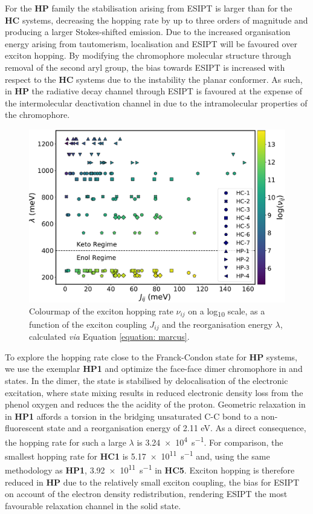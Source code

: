 For the \textbf{HP} family the stabilisation arising from ESIPT is larger than for the \textbf{HC} systems, decreasing the hopping rate by up to three orders of magnitude and producing a larger Stokes-shifted emission. Due to the increased organisation energy arising from tautomerism, localisation and ESIPT will be favoured over exciton hopping. By modifying the chromophore molecular structure through removal of the second aryl group, the bias towards ESIPT is increased with respect to the \textbf{HC} systems due to the instability the planar \Estar{} conformer. As such, in \textbf{HP} the radiative decay channel through ESIPT is favoured at the expense of the intermolecular deactivation channel in \Estar{} due to the intramolecular properties of the chromophore.
\begin{figure}
\centering
  \includegraphics[width=0.8\linewidth]{5ConnectingCrystalStructure/marcus_3dscatter_vdw.pdf}
  \caption[Exciton hopping rates]{Colourmap of the exciton hopping rate $\nu_{ij}$ on a log\textsubscript{10} scale, as a function of the exciton coupling $J_{ij}$ and the reorganisation energy $\lambda$, calculated \textit{via} Equation \ref{equation: marcus}.}
  \label{figure: marcus_scatter_vdw}
\end{figure}

To explore the hopping rate close to the Franck-Condon state for \textbf{HP} systems, we use the exemplar \textbf{HP1} and optimize the face-face dimer chromophore in \szero{} and \sone{} states. In the dimer, the \Estar{} state is stabilised by delocalisation of the electronic excitation, where state mixing results in reduced electronic density loss from the phenol oxygen and reduces the the acidity of the proton. Geometric relaxation in \Estar{} in \textbf{HP1} affords a torsion in the bridging unsaturated C-C bond to a non-fluorescent state and a reorganisation energy of 2.11 eV. As a direct consequence, the hopping rate for such a large $\lambda$ is \SI{3.24e4}{s^{-1}}. For comparison, the smallest hopping rate for \textbf{HC1} is \SI{5.17e+11}{s^{-1}} and, using the same methodology as \textbf{HP1}, \SI{3.92e+11}{s^{-1}} in \textbf{HC5}. Exciton hopping is therefore reduced in \textbf{HP} due to the relatively small exciton coupling, the bias for ESIPT on account of the electron density redistribution, rendering ESIPT the most favourable relaxation channel in the solid state.

